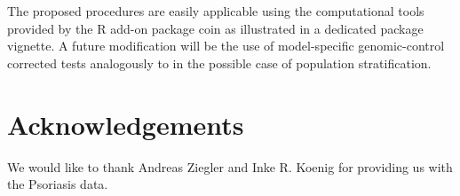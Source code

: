 \documentclass[bimj,fleqn]{w-art}
\newcommand{\Rpackage}[1]{{\normalfont\fontseries{b}\selectfont #1}}
\begin{document}
The proposed procedures are easily 
applicable using the computational tools provided by the \textsf{R} 
add-on package \Rpackage{coin} as illustrated in a dedicated package vignette. A future modification will be 
the use of model-specific genomic-control corrected tests 
analogously to \citet{Zang:2007} in the possible case of 
population stratification.

\section{Acknowledgements} 
We would like to thank Andreas Ziegler and Inke R. Koenig for providing 
us with the Psoriasis data.



\end{document}
